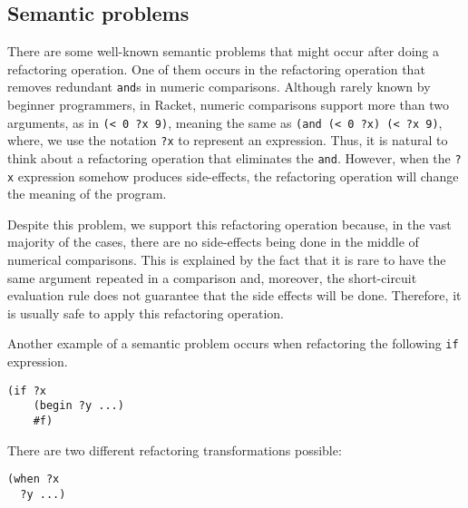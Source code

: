 \subsection{Semantic problems}
There are some well-known semantic problems that might occur after
doing a refactoring operation.  One of them occurs in the refactoring
operation that removes redundant {\tt and}s in numeric comparisons.
Although rarely known by beginner programmers, in Racket, numeric
comparisons support more than two arguments, as in \verb|(< 0 ?x 9)|,
meaning the same as %
\verb|(and (< 0 ?x) (< ?x 9)|, where, we use the notation \verb|?x| to
represent an expression. Thus, it is natural to think about a
refactoring operation that eliminates the \verb|and|.  However, when
the \verb|?x| expression somehow produces side-effects, the
refactoring operation will change the meaning of the program.


Despite this problem, we support this refactoring operation because,
in the vast majority of the cases, there are no side-effects being
done in the middle of numerical comparisons. This is explained by the fact that it is rare to have the same
argument repeated in a comparison and, moreover, the short-circuit evaluation rule does not
guarantee that the side effects will be done.
Therefore, it is usually safe to apply this refactoring operation.


Another example of a semantic problem occurs when refactoring the following {\tt if}
expression.
\begin{lstlisting}[basicstyle=\ttfamily, caption=Code sample]
(if ?x
    (begin ?y ...)
    #f)
\end{lstlisting}
There are two different refactoring transformations possible:
\begin{lstlisting}[basicstyle=\ttfamily, caption=Refactoring option 1]
(when ?x
  ?y ...)
\end{lstlisting}

